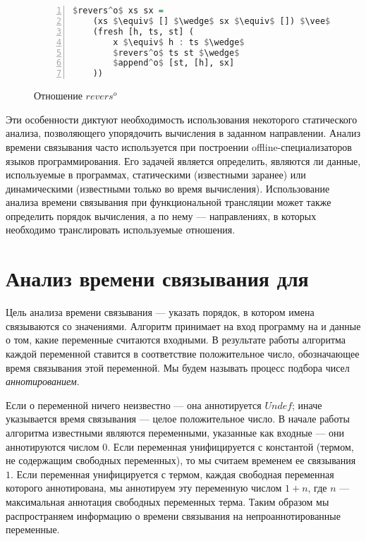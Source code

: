 \documentclass[conference,american,russian]{IEEEtran}
\begin{document}
\begin{figure}[h!]
  \begin{center}
  \begin{minipage}{0.35\textwidth}
  \begin{lstlisting}[language=Haskell, frame=single, numbers=left,numberstyle=\small, escapechar=|]
  $revers^o$ xs sx =
    (xs $\equiv$ [] $\wedge$ sx $\equiv$ []) $\vee$
    (fresh [h, ts, st] (
        x $\equiv$ h : ts $\wedge$
        $revers^o$ ts st $\wedge$
        $append^o$ [st, [h], sx]  
    ))
    \end{lstlisting}
  \end{minipage}
  \end{center}
  \caption{Отношение $revers^o$}
  \label{lst:reversoDEF}
\end{figure}

Эти особенности диктуют необходимость использования некоторого статического анализа, позволяющего упорядочить вычисления в заданном направлении. 
Анализ времени связывания часто используется при построении offline-специализаторов языков программирования. 
Его задачей является определить, являются ли данные, используемые в программах, статическими (известными заранее) или динамическими (известными только во время вычисления).
Использование анализа времени связывания при функциональной трансляции может также определить порядок вычисления, а по нему --- направлениях, в которых необходимо транслировать используемые отношения. 

\section{Анализ времени связывания для \miniKanren{}}\label{bta}

Цель анализа времени связывания --- указать порядок, в котором имена связываются со значениями.
Алгоритм принимает на вход программу на \miniKanren{} и данные о том, какие переменные считаются входными. 
В результате работы алгоритма каждой переменной ставится в соответствие положительное число, обозначающее время связывания этой переменной.
Мы будем называть процесс подбора чисел \emph{аннотированием}.

Если о переменной ничего неизвестно --- она аннотируется $Undef$; иначе указывается время связывания --- целое положительное число.
В начале работы алгоритма известными являются переменными, указанные как входные --- они аннотируются числом $0$.
Если переменная унифицируется с константой (термом, не содержащим свободных переменных), то мы считаем временем ее связывания $1$. 
Если переменная унифицируется с термом, каждая свободная переменная которого аннотирована, мы аннотируем эту переменную числом $1+n$, где $n$ --- максимальная аннотация свободных переменных терма. 
Таким образом мы распространяем информацию о времени связывания на непроаннотированные переменные.
\end{document}
